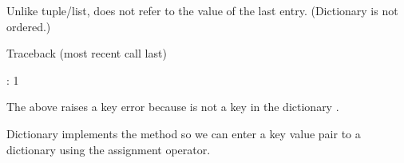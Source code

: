 \documentclass[letterpaper,10pt,english]{sphinxmanual}
\begin{document}
Unlike tuple/list,  does not refer to the value of the last entry. (Dictionary is not ordered.)

\begin{sphinxVerbatim}[commandchars=\\\{\}]
\PYG{p}{[}\PYG{p}{]}  
\end{sphinxVerbatim}

\begin{sphinxVerbatim}[commandchars=\\\{\}]
Traceback (most recent call last)
  
 \PYG{p}{[}\PYG{p}{]}  

: \PYGZhy{}1
\end{sphinxVerbatim}

The above raises a key error because  is not a key in the dictionary .

Dictionary implements the  method so we can enter a key value pair to a dictionary using the assignment operator.

\begin{sphinxVerbatim}[commandchars=\\\{\}]
\PYG{p}{[}\PYG{p}{]}  
\PYG{p}{[}\PYG{p}{]}
\end{sphinxVerbatim}
\end{document}

